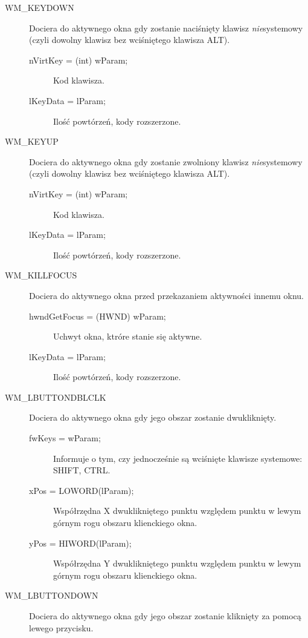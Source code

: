 \begin{description}
\item[WM\_KEYDOWN] Dociera do aktywnego okna gdy zostanie naciśnięty klawisz {\em nie}systemowy (czyli
	dowolny klawisz bez wciśniętego klawisza ALT).

        \begin{description}
		\item[nVirtKey = (int) wParam;] Kod klawisza.
		\item[lKeyData = lParam;] Ilość powtórzeń, kody rozszerzone.
	\end{description}

\item[WM\_KEYUP] Dociera do aktywnego okna gdy zostanie zwolniony klawisz {\em nie}systemowy (czyli
	dowolny klawisz bez wciśniętego klawisza ALT).

        \begin{description}
		\item[nVirtKey = (int) wParam;] Kod klawisza.
		\item[lKeyData = lParam;] Ilość powtórzeń, kody rozszerzone.
	\end{description}

\item[WM\_KILLFOCUS] Dociera do aktywnego okna przed przekazaniem aktywności innemu oknu.

        \begin{description}
		\item[hwndGetFocus = (HWND) wParam;] Uchwyt okna, ktróre stanie się aktywne.
		\item[lKeyData = lParam;] Ilość powtórzeń, kody rozszerzone.
	\end{description}

\item[WM\_LBUTTONDBLCLK] Dociera do aktywnego okna gdy jego obszar zostanie dwukliknięty.

        \begin{description}
		\item[fwKeys = wParam;] Informuje o tym, czy jednocześnie są wciśnięte klawisze systemowe: SHIFT, CTRL.
		\item[xPos = LOWORD(lParam);] Współrzędna X dwuklikniętego punktu względem punktu w lewym górnym
			rogu obszaru klienckiego okna.
		\item[yPos = HIWORD(lParam);] Współrzędna Y dwuklikniętego punktu względem punktu w lewym górnym
			rogu obszaru klienckiego okna.
	\end{description}

\item[WM\_LBUTTONDOWN] Dociera do aktywnego okna gdy jego obszar zostanie kliknięty za pomocą lewego przycisku.


\end{description}
